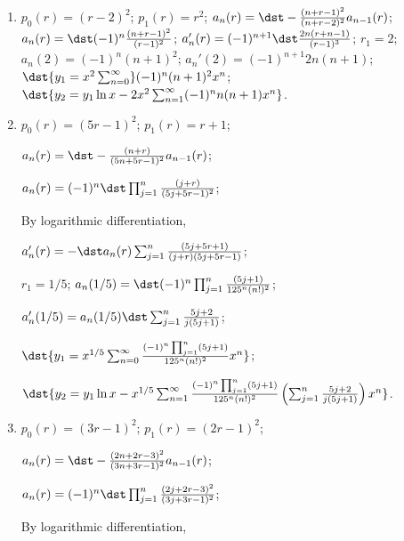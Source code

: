 \documentclass[openany]{book}
\newenvironment{sectionSolutions}{
 \begin{enumerate}[item-label={\thesection.\arabic{enumi}.}]
}{
 \end{enumerate}
}
\begin{document}
\begin{sectionSolutions}
$a_n(r)=\dst\frac{(-4)^n}{\prod_{j=1}^n(2j+2r-1)}$.

By logarithmic differentiation,
$a_n'(r)=\dst a_n(r)\sum_{j=1}^n\frac{2}{2j+2r-1}$;

$r_1=1/2$;
$a_n(1/2)=\dst\frac{(-1)^n}{(n!)^2}$;

$a_n'(1/2)=a_n(1/2)\dst\left(-2\sum_{j=1}^n\frac{1}{ j}\right)$;

$\dst{y_1=x^{1/2}\sum_{n=0}^\infty\frac{(-1)^n}{(n!)^2}x^n}$;

$\dst{y_2=y_1\ln x-2x^{1/2}\sum_{n=1}^\infty
\frac{(-1)^n}{(n!)^2}\left(\sum_{j=1}^n\frac{1}{ j}\right)x^n}$;



\item
$p_0(r)=(r-2)^2$;
$p_1(r)=r^2$;
$a_n(r)=\dst-\frac{(n+r-1)^2}{(n+r-2)^2}a_{n-1}(r)$;
 $a_n(r)=\dst(-1)^n\frac{(n+r-1)^2}{(r-1)^2}$;
$a_n'(r)=(-1)^{n+1}\dst\frac{2n(r+n-1)}{(r-1)^3}$;
$r_1=2$;
$a_n(2)=(-1)^n(n+1)^2$;
$a_n'(2)=(-1)^{n+1}2n(n+1)$;
$\dst{y_1=x^2\sum_{n=0}^\infty} (-1)^n(n+1)^2x^n$;
$\dst{y_2=y_1\ln
x-2x^2\sum_{n=1}^\infty(-1)^nn(n+1)x^n}$.



\item
$p_0(r)=(5r-1)^2$;
$p_1(r)=r+1$;

$a_n(r)=\dst-\frac{(n+r)}{(5n+5r-1)^2}
a_{n-1}(r)$;

 $a_n(r)=(-1)^n\dst\prod_{j=1}^n\frac{(j+r)}{(5j+5r-1)^2}$;

By logarithmic differentiation,

$a_n'(r)=-\dst a_n(r)\sum_{j=1}^n\frac{(5j+5r+1)}{(j+r)(5j+5r-1)}$;

$r_1=1/5$;
$a_n(1/5)=\dst(-1)^n\prod_{j=1}^n\frac{(5j+1)}{125^n(n!)^2}$;

$a_n'(1/5)=a_n(1/5)\dst
\sum_{j=1}^n\frac{5j+2}{ j(5j+1)}$;

$\dst{y_1=x^{1/5}\sum_{n=0}^\infty\frac{(-1)^n\prod_{j=1}^n(5j+1)}{
125^n(n!)^2} x^n}$;

$\dst{y_2=
y_1\ln
x-x^{1/5}\sum_{n=1}^\infty\frac{(-1)^n\prod_{j=1}^n(5j+1)}{125^n(n!)^2}
\left(\sum_{j=1}^n\frac{5j+2}{ j(5j+1)}\right)x^n}$.


\item
$p_0(r)=(3r-1)^2$;
$p_1(r)=(2r-1)^2$;

$a_n(r)=\dst-\frac{(2n+2r-3)^2}{(3n+3r-1)^2}a_{n-1}(r)$;

 $a_n(r)=(-1)^n\dst\prod_{j=1}^n\frac{(2j+2r-3)^2}{(3j+3r-1)^2}$;

By logarithmic differentiation,


\end{sectionSolutions}
\end{document}
